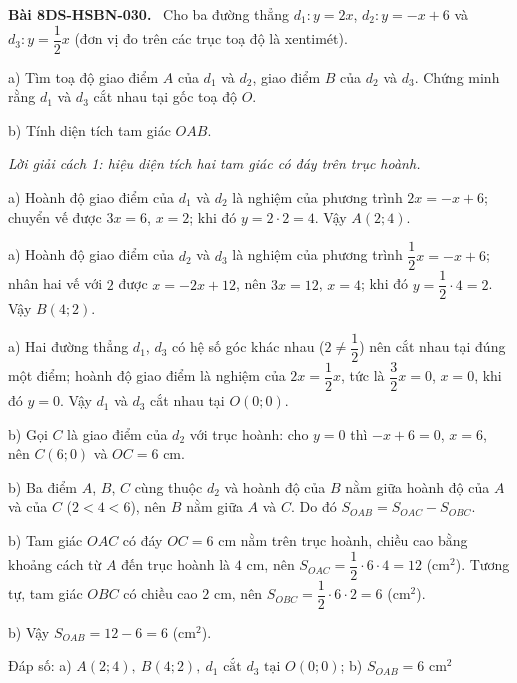\documentclass[12pt,a4paper]{article}
\newenvironment{problem}[1][]{\par\medskip\noindent\textbf{Bài #1.}\ }{\par}
\newenvironment{solution}[1][]{\par\noindent\textit{Lời giải #1.}\par}{\par}
\begin{document}
\begin{problem}[8DS-HSBN-030]
Cho ba đường thẳng $d_1\colon y = 2x$, $d_2\colon y = -x + 6$ và $d_3\colon y = \dfrac{1}{2}x$ (đơn vị đo trên các trục toạ độ là xentimét).

a) Tìm toạ độ giao điểm $A$ của $d_1$ và $d_2$, giao điểm $B$ của $d_2$ và $d_3$. Chứng minh rằng $d_1$ và $d_3$ cắt nhau tại gốc toạ độ $O$.

b) Tính diện tích tam giác $OAB$.

\begin{solution}[cách 1: hiệu diện tích hai tam giác có đáy trên trục hoành]
a) Hoành độ giao điểm của $d_1$ và $d_2$ là nghiệm của phương trình $2x = -x + 6$; chuyển vế được $3x = 6$, $x = 2$; khi đó $y = 2 \cdot 2 = 4$. Vậy $A(2; 4)$.

a) Hoành độ giao điểm của $d_2$ và $d_3$ là nghiệm của phương trình $\dfrac{1}{2}x = -x + 6$; nhân hai vế với $2$ được $x = -2x + 12$, nên $3x = 12$, $x = 4$; khi đó $y = \dfrac{1}{2} \cdot 4 = 2$. Vậy $B(4; 2)$.

a) Hai đường thẳng $d_1$, $d_3$ có hệ số góc khác nhau ($2 \neq \dfrac{1}{2}$) nên cắt nhau tại đúng một điểm; hoành độ giao điểm là nghiệm của $2x = \dfrac{1}{2}x$, tức là $\dfrac{3}{2}x = 0$, $x = 0$, khi đó $y = 0$. Vậy $d_1$ và $d_3$ cắt nhau tại $O(0; 0)$.

b) Gọi $C$ là giao điểm của $d_2$ với trục hoành: cho $y = 0$ thì $-x + 6 = 0$, $x = 6$, nên $C(6; 0)$ và $OC = 6$ cm.

b) Ba điểm $A$, $B$, $C$ cùng thuộc $d_2$ và hoành độ của $B$ nằm giữa hoành độ của $A$ và của $C$ ($2 < 4 < 6$), nên $B$ nằm giữa $A$ và $C$. Do đó $S_{OAB} = S_{OAC} - S_{OBC}$.

b) Tam giác $OAC$ có đáy $OC = 6$ cm nằm trên trục hoành, chiều cao bằng khoảng cách từ $A$ đến trục hoành là $4$ cm, nên $S_{OAC} = \dfrac{1}{2} \cdot 6 \cdot 4 = 12$ (cm$^2$). Tương tự, tam giác $OBC$ có chiều cao $2$ cm, nên $S_{OBC} = \dfrac{1}{2} \cdot 6 \cdot 2 = 6$ (cm$^2$).

b) Vậy $S_{OAB} = 12 - 6 = 6$ (cm$^2$).

Đáp số: a) $\boxed{A(2; 4),\ B(4; 2),\ d_1 \text{ cắt } d_3 \text{ tại } O(0; 0)}$; b) $\boxed{S_{OAB} = 6 \text{ cm}^2}$
\end{solution}


\end{problem}
\end{document}
